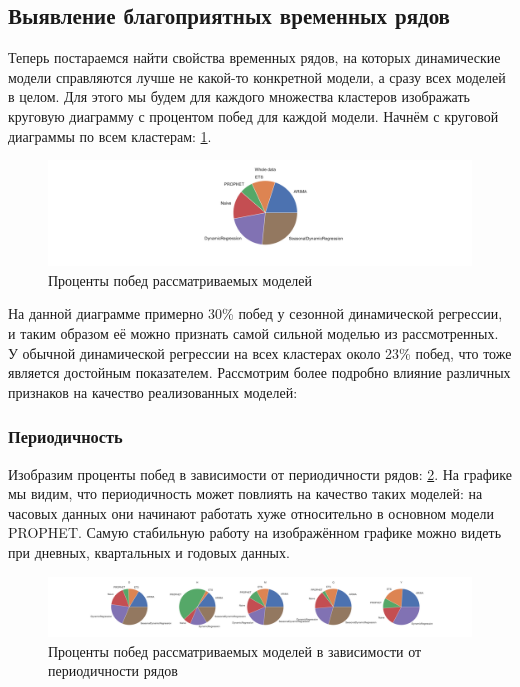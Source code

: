 \documentclass[a4paper,14pt]{extarticle}
\begin{document}
	\subsection{Выявление благоприятных временных рядов}
	Теперь постараемся найти свойства временных рядов, на которых динамические модели справляются лучше не какой-то конкретной модели, а сразу всех моделей в целом. Для этого мы будем для каждого множества кластеров изображать круговую диаграмму с процентом побед для каждой модели. Начнём с круговой диаграммы по всем кластерам: \ref{wins:full}.
	\begin{figure}[!h]
		\captionsetup{justification=centering}
		\centering
		\includegraphics[width=\linewidth]{pictures/wins-full.pdf}
		\caption{Проценты побед рассматриваемых моделей}
		\label{wins:full}
	\end{figure}
	На данной диаграмме примерно 30\% побед у сезонной динамической регрессии, и таким образом её можно признать самой сильной моделью из рассмотренных. У обычной динамической регрессии на всех кластерах около 23\% побед, что тоже является достойным показателем. Рассмотрим более подробно влияние различных признаков на качество реализованных моделей:
	\subsubsection{Периодичность}
	Изобразим проценты побед в зависимости от периодичности рядов: \ref{wins:periodicity}. На графике мы видим, что периодичность может повлиять на качество таких моделей: на часовых данных они начинают работать хуже относительно в основном модели PROPHET. Самую стабильную работу на изображённом графике можно видеть при дневных, квартальных и годовых данных.
	\begin{figure}[!h]
		\captionsetup{justification=centering}
		\centering
		\includegraphics[width=\linewidth]{pictures/wins-periodicity.pdf}
		\caption{Проценты побед рассматриваемых моделей в зависимости от периодичности рядов}
		\label{wins:periodicity}
	\end{figure}
\end{document}
